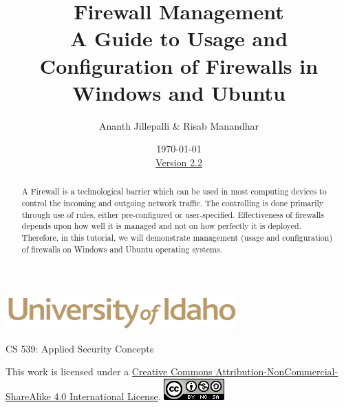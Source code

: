 \documentclass[12pt]{extarticle}
\begin{document}
\title{ Firewall Management\\ \normalsize A Guide to Usage and Configuration of Firewalls in Windows and Ubuntu}
\author{Ananth Jillepalli \& Risab Manandhar}
\date{\today \\ \hyperref[changelog]{Version 2.2}}
\renewcommand{\abstractname}{Summary}
\begin{titlepage}
\maketitle
{}
\begin{center}
\includegraphics[scale=.5]{UofI}

\large{CS 539: Applied Security Concepts}

\vskip 40pt

\end{center}
\begin{abstract}
A Firewall is a technological barrier which can be used in most computing devices to control the incoming and outgoing network traffic. The controlling is done primarily through use of rules, either pre-configured or user-specified. Effectiveness of firewalls depends upon how well it is managed and not on how perfectly it is deployed. Therefore, in this tutorial, we will demonstrate management (usage and configuration) of firewalls on Windows and Ubuntu operating systems.  
\end{abstract}


\vfill
\begin{center}
This work is licensed under a \href{https://creativecommons.org/licenses/by-nc-sa/4.0/legalcode}{Creative Commons Attribution-NonCommercial-ShareAlike 4.0 International License}.
\vskip 10pt
\includegraphics[scale=.5]{cc}
\end{center}

\end{titlepage}


\pagebreak
\tableofcontents

\end{document}
